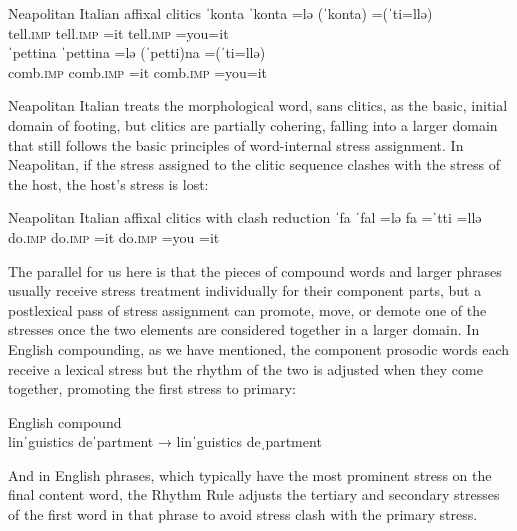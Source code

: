 \documentclass[output=paper,
modfonts
]{LSP/langsci}
\begin{document}
\ea Neapolitan Italian \citep{peperkamp1997} affixal clitics
	\ea \gll ˈkonta {\quad\quad} ˈkonta \squish=lə {\quad\quad} (ˈkonta) \squish=(ˈti=llə)\\
	tell.\textsc{imp} {} tell.\textsc{imp} \squish=it {} tell.\textsc{imp} \squish=you=it\\ 

	\ex \gll ˈpettina {\quad\quad} ˈpettina \squish=lə {\quad\quad} (ˈpetti)na \squish=(ˈti=llə)\\
	comb.\textsc{imp} {} comb.\textsc{imp} \squish=it {} comb.\textsc{imp} \squish=you=it\\
	\z
\z

\noindent Neapolitan Italian treats the morphological word, sans clitics, as the basic, initial domain of footing, but clitics are partially cohering, falling into a larger domain that still follows the basic principles of word-internal stress assignment. In Neapolitan, if the stress assigned to the clitic sequence clashes with the stress of the host, the host’s stress is lost:

\ea Neapolitan Italian \citep{peperkamp1997} affixal clitics with clash reduction
\gll ˈfa {\quad\quad} ˈfal \squish=lə {\quad\quad} fa \squish=ˈtti  \squish=llə\\
	do.\textsc{imp} {} do.\textsc{imp} \squish=it {} do.\textsc{imp} \squish=you \squish=it\\
\z

\noindent The parallel for us here is that the pieces of compound words and larger phrases usually receive stress treatment individually for their component parts, but a postlexical pass of stress assignment can promote, move, or demote one of the stresses once the two elements are considered together in a larger domain. In English compounding, as we have mentioned, the component prosodic words each receive a lexical stress but the rhythm of the two is adjusted when they come together, promoting the first stress to primary:

\ea English compound \\
linˈguistics deˈpartment  → linˈguistics deˌpartment
\z 

\noindent And in English phrases, which typically have the most prominent stress on the final content word, the Rhythm Rule \citep{hayes1984k} adjusts the tertiary and secondary stresses of the first word in that phrase to avoid stress clash with the primary stress.
\end{document}
